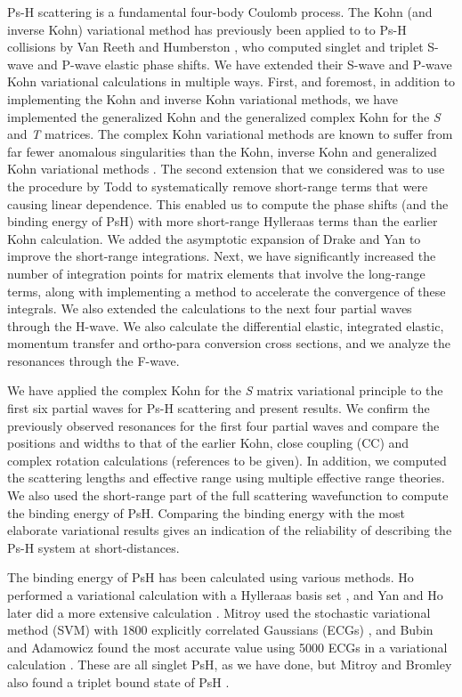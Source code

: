 \documentclass[preprint,showpacs,preprintnumbers,amsmath,amssymb,longbibliography,pra,aps]{revtex4-1}
\begin{document}
Ps-H scattering is a fundamental four-body Coulomb process. The Kohn (and inverse Kohn) variational method has previously been applied to
to Ps-H collisions by Van Reeth and Humberston \cite{VanReeth2003,VanReeth2004}, who computed singlet and triplet
S-wave and P-wave elastic phase shifts. 
We have extended their S-wave and P-wave Kohn variational calculations in multiple ways.
First, and foremost, in addition to implementing
the Kohn and inverse Kohn variational methods, we have
implemented the generalized Kohn and the generalized complex Kohn
for the \emph{S} and \emph{T} matrices. 
The complex Kohn variational methods are known to suffer
from far fewer anomalous singularities than the
Kohn, inverse Kohn and generalized Kohn variational methods \cite{Lucchese1989, Cooper2009, Cooper2010}. 
The second extension that we considered was to use
the procedure by Todd to systematically remove short-range terms that
were causing linear dependence.
This enabled us to compute the phase shifts (and the binding
energy of PsH) with more short-range Hylleraas terms than the earlier 
Kohn calculation. We added the asymptotic expansion of Drake and Yan \cite{Drake1995, Yan1997} to improve the short-range integrations.
Next, we have significantly increased the number of integration points for matrix elements that involve the long-range terms, along with implementing a method to accelerate the convergence of these integrals. We also extended the calculations to the next four partial waves through the H-wave. We also calculate the differential elastic, integrated elastic, momentum transfer and ortho-para conversion cross sections, and we analyze the resonances through the F-wave.

We have applied the complex Kohn for the \emph{S} matrix variational principle to the first six partial waves for Ps-H scattering and present results. We confirm the previously observed resonances for the first four partial waves and compare the positions and widths to that of the earlier Kohn, close coupling (CC) and complex rotation calculations (references to be given). In addition, we computed the scattering lengths and effective range using multiple effective range theories. We also used the short-range part of the full scattering wavefunction to compute the binding energy of PsH. Comparing the binding energy with the most elaborate variational results gives an indication of the reliability of describing the Ps-H system at short-distances.

The binding energy of PsH has been calculated using various methods. Ho performed a variational calculation with a Hylleraas basis set \cite{Ho1986}, and Yan and Ho later did a more extensive calculation \cite{Yan1999}. Mitroy used the stochastic variational method (SVM) with 1800 explicitly correlated Gaussians (ECGs) \cite{Mitroy2006}, and Bubin and Adamowicz found the most accurate value using 5000 ECGs in a variational calculation \cite{Bubin2006}. These are all singlet PsH, as we have done, but Mitroy and Bromley also found a triplet bound state of PsH \cite{Mitroy2007}.
\end{document}

